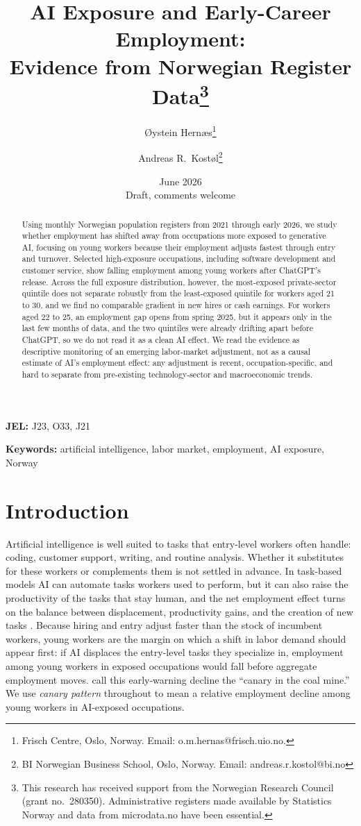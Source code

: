 \documentclass[12pt]{article}
\title{\textbf{AI Exposure and Early-Career Employment:\\Evidence from Norwegian Register Data}\thanks{This research has received support from the Norwegian Research Council (grant no.\ 280350). Administrative registers made available by Statistics Norway and data from microdata.no have been essential.}}
\author{
  {\O}ystein Hern{\ae}s\thanks{Frisch Centre, Oslo, Norway. Email: o.m.hernas@frisch.uio.no.}
  \and
  Andreas R.\ Kost{\o}l\thanks{BI Norwegian Business School, Oslo, Norway. Email: andreas.r.kostol@bi.no}
}
\date{June 2026\\[6pt]\small Draft, comments welcome}
\begin{document}
\maketitle

\begin{abstract}
\noindent
Using monthly Norwegian population registers from 2021 through early 2026, we study whether employment has shifted away from occupations more exposed to generative AI, focusing on young workers because their employment adjusts fastest through entry and turnover. Selected high-exposure occupations, including software development and customer service, show falling employment among young workers after ChatGPT's release. Across the full exposure distribution, however, the most-exposed private-sector quintile does not separate robustly from the least-exposed quintile for workers aged 21 to 30, and we find no comparable gradient in new hires or cash earnings. For workers aged 22 to 25, an employment gap opens from spring 2025, but it appears only in the last few months of data, and the two quintiles were already drifting apart before ChatGPT, so we do not read it as a clean AI effect. We read the evidence as descriptive monitoring of an emerging labor-market adjustment, not as a causal estimate of AI's employment effect: any adjustment is recent, occupation-specific, and hard to separate from pre-existing technology-sector and macroeconomic trends.
\end{abstract}

\textbf{JEL:} J23, O33, J21

\textbf{Keywords:} artificial intelligence, labor market, employment, AI exposure, Norway

\clearpage
\setcounter{page}{1}


\section{Introduction}
\label{sec:introduction}

Artificial intelligence is well suited to tasks that entry-level workers often handle: coding, customer support, writing, and routine analysis. Whether it substitutes for these workers or complements them is not settled in advance. In task-based models AI can automate tasks workers used to perform, but it can also raise the productivity of the tasks that stay human, and the net employment effect turns on the balance between displacement, productivity gains, and the creation of new tasks \citep{acemoglu2025}. Because hiring and entry adjust faster than the stock of incumbent workers, young workers are the margin on which a shift in labor demand should appear first: if AI displaces the entry-level tasks they specialize in, employment among young workers in exposed occupations would fall before aggregate employment moves. \citet{brynjolfsson2025} call this early-warning decline the ``canary in the coal mine.'' We use \emph{canary pattern} throughout to mean a relative employment decline among young workers in AI-exposed occupations.
\end{document}
